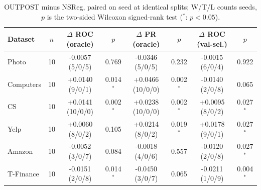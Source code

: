 \begin{table}[t]
\centering
\small
\begin{tabular}{lccccccc}
\toprule
Dataset & $n$ & $\Delta$ ROC (oracle) & $p$ & $\Delta$ PR (oracle) & $p$ & $\Delta$ ROC (val-sel.) & $p$ \\
\midrule
Photo & 10 & -0.0057 (5/0/5) & 0.769 & -0.0346 (5/0/5) & 0.232 & -0.0015 (6/0/4) & 0.922 \\
Computers & 10 & +0.0140 (9/0/1) & 0.014$^{*}$ & +0.0466 (10/0/0) & 0.002$^{*}$ & -0.0140 (2/0/8) & 0.065 \\
CS & 10 & +0.0141 (10/0/0) & 0.002$^{*}$ & +0.0238 (10/0/0) & 0.002$^{*}$ & +0.0095 (8/0/2) & 0.027$^{*}$ \\
Yelp & 10 & +0.0060 (8/0/2) & 0.105 & +0.0214 (8/0/2) & 0.019$^{*}$ & +0.0178 (9/0/1) & 0.027$^{*}$ \\
Amazon & 10 & -0.0052 (3/0/7) & 0.084 & -0.0018 (4/0/6) & 0.557 & -0.0120 (2/0/8) & 0.027$^{*}$ \\
T-Finance & 10 & -0.0151 (2/0/8) & 0.014$^{*}$ & -0.0450 (3/0/7) & 0.065 & -0.0211 (1/0/9) & 0.004$^{*}$ \\
\bottomrule
\end{tabular}
\caption{OUTPOST minus NSReg, paired on seed at identical splits; W/T/L counts seeds, $p$ is the two-sided Wilcoxon signed-rank test ($^{*}$: $p<0.05$).}
\label{tab:paired_nsreg}
\end{table}
